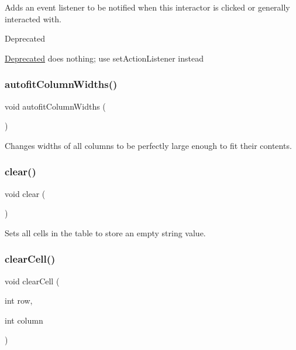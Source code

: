 Adds an event listener to be notified when this interactor is clicked or generally interacted with. 

\begin{DoxyRefDesc}{Deprecated}
\item[\mbox{\hyperlink{deprecated__deprecated000006}{Deprecated}}]does nothing; use set\+Action\+Listener instead \end{DoxyRefDesc}
\mbox{\label{classGTable_afaf36ccb6a75432b5f5463613ef01ef4}} 
\subsubsection{\texorpdfstring{autofit\+Column\+Widths()}{autofitColumnWidths()}}
{\footnotesize\ttfamily void autofit\+Column\+Widths (\begin{DoxyParamCaption}{ }\end{DoxyParamCaption})\hspace{0.3cm}{\ttfamily [virtual]}}



Changes widths of all columns to be perfectly large enough to fit their contents. 

\mbox{\label{classGTable_ac8bb3912a3ce86b15842e79d0b421204}} 
\subsubsection{\texorpdfstring{clear()}{clear()}}
{\footnotesize\ttfamily void clear (\begin{DoxyParamCaption}{ }\end{DoxyParamCaption})\hspace{0.3cm}{\ttfamily [virtual]}}



Sets all cells in the table to store an empty string value. 

\mbox{\label{classGTable_ab7bffbf52806e438ac155886079d9bf6}} 
\subsubsection{\texorpdfstring{clear\+Cell()}{clearCell()}}
{\footnotesize\ttfamily void clear\+Cell (\begin{DoxyParamCaption}\item[{int}]{row,  }\item[{int}]{column }\end{DoxyParamCaption})\hspace{0.3cm}{\ttfamily [virtual]}}



